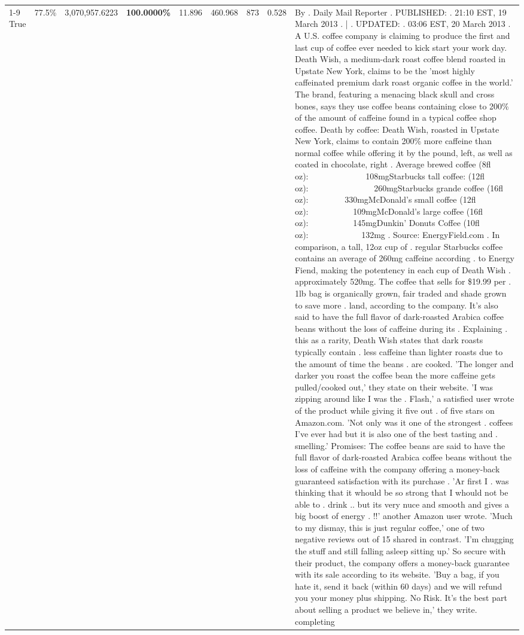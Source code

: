 \begin{table}[H]
{\begin{tabular}{lllrlllll}
\cline{1-9}
True & 77.5\% & 3,070,957.6223 & \bfseries \color{red} 100.0000\% & 11.896 & 460.968 & 873 & 0.528 & By . Daily Mail Reporter . PUBLISHED: . 21:10 EST, 19 March 2013 . | . UPDATED: . 03:06 EST, 20 March 2013 . A U.S. coffee company is claiming to produce the first and last cup of coffee ever needed to kick start your work day. Death Wish, a medium-dark roast coffee blend roasted in Upstate New York, claims to be the 'most highly caffeinated premium dark roast organic coffee in the world.' The brand, featuring a menacing black skull and cross bones, says they use coffee beans containing close to 200\% of the amount of caffeine found in a typical coffee shop coffee. Death by coffee: Death Wish, roasted in Upstate New York, claims to contain 200\% more caffeine than normal coffee while offering it by the pound, left, as well as coated in chocolate, right . Average brewed coffee (8fl oz):              108mgStarbucks tall coffee: (12fl oz):                260mgStarbucks grande coffee (16fl oz):         330mgMcDonald's small coffee (12fl oz):           109mgMcDonald's large coffee (16fl oz):           145mgDunkin' Donuts Coffee (10fl oz):             132mg . Source: EnergyField.com . In comparison, a tall, 12oz cup of . regular Starbucks coffee contains an average of 260mg caffeine according . to Energy Fiend, making the potentency in each cup of Death Wish . approximately 520mg. The coffee that sells for \$19.99 per . 1lb bag is organically grown, fair traded and shade grown to save more . land, according to the company. It's also said to have the full flavor of dark-roasted Arabica coffee beans without the loss of caffeine during its . Explaining . this as a rarity, Death Wish states that dark roasts typically contain . less caffeine than lighter roasts due to the amount of time the beans . are cooked. 'The longer and darker you roast the coffee bean the more caffeine gets pulled/cooked out,' they state on their website. 'I was zipping around like I was the . Flash,' a satisfied user wrote of the product while giving it five out . of five stars on Amazon.com. 'Not only was it one of the strongest . coffees I've ever had but it is also one of the best tasting and . smelling.’ Promises: The coffee beans are said to have the full flavor of dark-roasted Arabica coffee beans without the loss of caffeine with the company offering a money-back guaranteed satisfaction with its purchase . 'Ar first I . was thinking that it whould be so strong that I whould not be able to . drink .. but its very nuce and smooth and gives a big boost of energy . !!' another Amazon user wrote. 'Much to my dismay, this is just regular coffee,' one of two negative reviews out of 15 shared in contrast. 'I'm chugging the stuff and still falling asleep sitting up.' So secure with their product, the company offers a money-back guarantee with its sale according to its website. 'Buy a bag, if you hate it, send it back (within 60 days) and we will refund you your money plus shipping. No Risk. It’s the best part about selling a product we believe in,' they write. completing \\

\end{tabular}}
\end{table}

